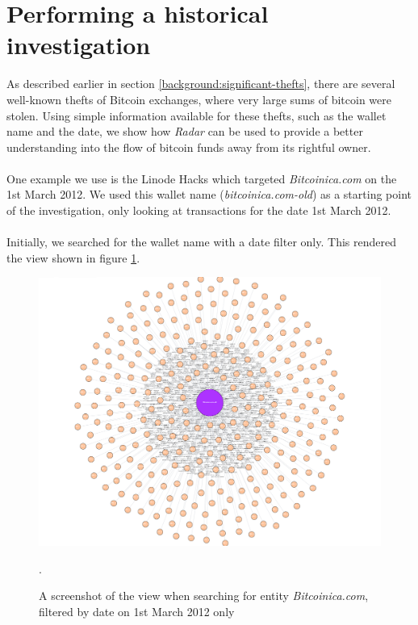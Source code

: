 \section{Performing a historical investigation}
As described earlier in section \ref{background:significant-thefts}, there are several well-known thefts of Bitcoin exchanges, where very large sums of bitcoin were stolen. Using simple information available for these thefts, such as the wallet name and the date, we show how \textit{Radar} can be used to provide a better understanding into the flow of bitcoin funds away from its rightful owner.
\\\\
One example we use is the Linode Hacks which targeted \textit{Bitcoinica.com} on the 1st March 2012. We used this wallet name (\textit{bitcoinica.com-old}) as a starting point of the investigation, only looking at transactions for the date 1st March 2012. 
\\\\
Initially, we searched for the wallet name with a date filter only. This rendered the view shown in figure \ref{fig:theft-no-filter}.

\begin{figure}[h!]
  \centering
  \includegraphics[width = 15cm]{./figures/theft-all-txs-1st-march}\\[0.5cm]
  \caption{A screenshot of the view when searching for entity \textit{Bitcoinica.com}, filtered by date on 1st March 2012 only}.
  \label{fig:theft-no-filter}
\end{figure}

